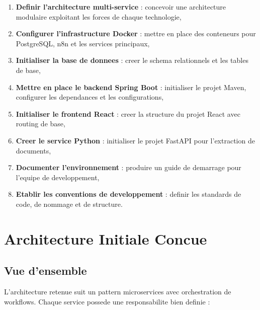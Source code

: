 \begin{enumerate}
    \item \textbf{Definir l'architecture multi-service} : concevoir une architecture modulaire exploitant les forces de chaque technologie,
    
    \item \textbf{Configurer l'infrastructure Docker} : mettre en place des conteneurs pour PostgreSQL, n8n et les services principaux,
    
    \item \textbf{Initialiser la base de donnees} : creer le schema relationnels et les tables de base,
    
    \item \textbf{Mettre en place le backend Spring Boot} : initialiser le projet Maven, configurer les dependances et les configurations,
    
    \item \textbf{Initialiser le frontend React} : creer la structure du projet React avec routing de base,
    
    \item \textbf{Creer le service Python} : initialiser le projet FastAPI pour l'extraction de documents,
    
    \item \textbf{Documenter l'environnement} : produire un guide de demarrage pour l'equipe de developpement,
    
    \item \textbf{Etablir les conventions de developpement} : definir les standards de code, de nommage et de structure.
\end{enumerate}

\section{Architecture Initiale Concue}

\subsection{Vue d'ensemble}

L'architecture retenue suit un pattern microservices avec orchestration de workflows. Chaque service possede une responsabilite bien definie :

